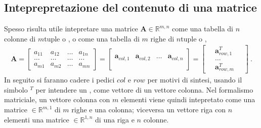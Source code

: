 \documentclass[letterpaper,10pt,italian]{jupyterBook}
\begin{document}
\subsection{Inteprepretazione del contenuto di una matrice}
\label{\detokenize{ch/algebra/linear-algebra:inteprepretazione-del-contenuto-di-una-matrice}}\label{\detokenize{ch/algebra/linear-algebra:math-hs-algebra-linear-matrices-content}}
\sphinxAtStartPar
Spesso risulta utile intepretare una matrice \(\mathbf{A} \in \mathbb{R}^{m,n}\) come una tabella di \(n\) colonne di \(m\)\sphinxhyphen{}tuple o , o come una tabella di \(m\) righe di \(n\)\sphinxhyphen{}tuple o ,
\begin{equation*}
\begin{split}\mathbf{A} =
\begin{bmatrix}
a_{11} & a_{12} & \dots & a_{1n} \\
\dots  & \dots  & \dots & \dots  \\
a_{m1} & a_{m2} & \dots & a_{mn}
\end{bmatrix} = 
\left[ \begin{array}{c|c|c|c}
                   &                    &       &                    \\
\mathbf{a}_{col,1} & \mathbf{a}_{col,2} & \dots & \mathbf{a}_{col,n} \\
                   &                    &       &                    \\
\end{array}
\right] = 
\begin{bmatrix} \quad \mathbf{a}^T_{row,1} \quad  \\ \hline \quad \dots \quad  \\ \hline \quad \mathbf{a}^T_{row,m} \quad \end{bmatrix} \ .
\end{split}
\end{equation*}
\sphinxAtStartPar
In seguito si faranno cadere i pedici \(col\) e \(row\) per motivi di sintesi, usando il simbolo \(^T\) per intendere un , come vettore  di un vettore colonna. Nel formalismo matriciale, un vettore colonna con \(m\) elementi viene quindi intepretato come una matrice \(\in \mathbb{R}^{m,1}\) di \(m\) righe e una colonna; viceversa un vettore riga con \(n\) elementi una matrice \(\in \mathbb{R}^{1,n}\) di una riga e \(n\) colonne.
\end{document}
